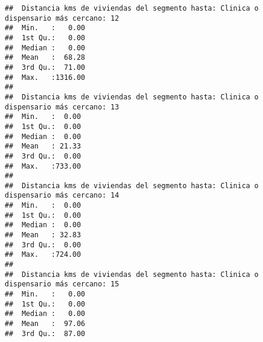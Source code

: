 \documentclass[11pt,]{article}
\begin{document}
\begin{verbatim}
##  Distancia kms de viviendas del segmento hasta: Clinica o dispensario más cercano: 12
##  Min.   :   0.00                                                                     
##  1st Qu.:   0.00                                                                     
##  Median :   0.00                                                                     
##  Mean   :  68.28                                                                     
##  3rd Qu.:  71.00                                                                     
##  Max.   :1316.00                                                                     
##                                                                                      
##  Distancia kms de viviendas del segmento hasta: Clinica o dispensario más cercano: 13
##  Min.   :  0.00                                                                      
##  1st Qu.:  0.00                                                                      
##  Median :  0.00                                                                      
##  Mean   : 21.33                                                                      
##  3rd Qu.:  0.00                                                                      
##  Max.   :733.00                                                                      
##                                                                                      
##  Distancia kms de viviendas del segmento hasta: Clinica o dispensario más cercano: 14
##  Min.   :  0.00                                                                      
##  1st Qu.:  0.00                                                                      
##  Median :  0.00                                                                      
##  Mean   : 32.83                                                                      
##  3rd Qu.:  0.00                                                                      
##  Max.   :724.00                                                                      
##                                                                                      
##  Distancia kms de viviendas del segmento hasta: Clinica o dispensario más cercano: 15
##  Min.   :   0.00                                                                     
##  1st Qu.:   0.00                                                                     
##  Median :   0.00                                                                     
##  Mean   :  97.06                                                                     
##  3rd Qu.:  87.00                                                                     

\end{verbatim}
\end{document}
